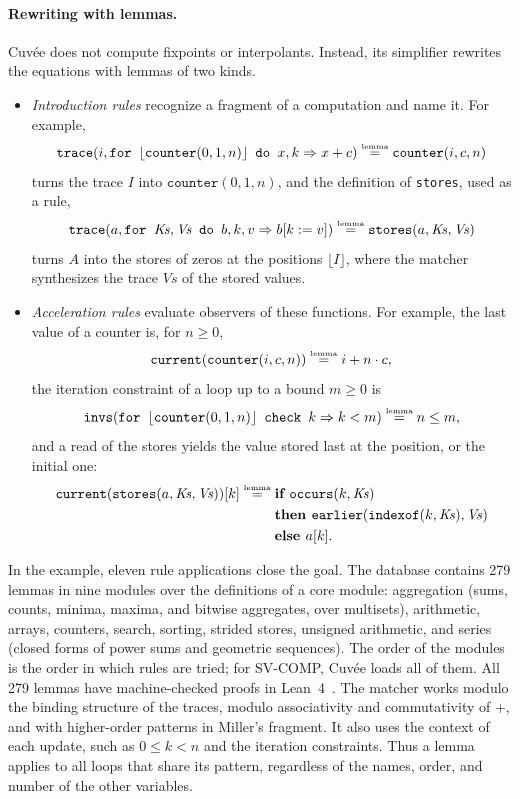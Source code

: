 \documentclass[runningheads]{llncs}
\newcommand{\cuvee}{Cuvée}
\newcommand{\lf}[1]{\lfloor #1 \rfloor}
\newcommand{\code}[1]{\texttt{#1}}
\newcommand{\lemeq}{\mathrel{\overset{\text{\tiny lemma}}{=}}}
\begin{document}
\paragraph{Rewriting with lemmas.}
\cuvee{} does not compute fixpoints or interpolants. Instead, its simplifier rewrites the equations with
lemmas of two kinds.
\begin{itemize}
\item \emph{Introduction rules} recognize a fragment of a computation and name it. For example,
  \[\code{trace}(i, \code{for } \lf{\code{counter}(0, 1, n)} \code{ do } x, k \Rightarrow x + c)
    \lemeq \code{counter}(i, c, n)\]
  turns the trace $I$ into $\code{counter}(0, 1, n)$, and the definition of \code{stores}, used as a rule,
  \[\code{trace}(a, \code{for } \mathit{Ks}, \mathit{Vs} \code{ do } b, k, v \Rightarrow b[k := v])
    \lemeq \code{stores}(a, \mathit{Ks}, \mathit{Vs})\]
  turns $A$ into the stores of zeros at the positions $\lf{I}$, where the matcher synthesizes the trace
  $\mathit{Vs}$ of the stored values.
\item \emph{Acceleration rules} evaluate observers of these functions. For example, the last value of a
  counter is, for $n \ge 0$,
  \[\code{current}(\code{counter}(i, c, n)) \lemeq i + n \cdot c,\]
  the iteration constraint of a loop up to a bound $m \ge 0$ is
  \[\code{invs}(\code{for } \lf{\code{counter}(0, 1, n)} \code{ check } k \Rightarrow k < m) \lemeq n \le m,\]
  and a read of the stores yields the value stored last at the position, or the initial one:
  \begin{align*}
    \code{current}(\code{stores}(a, \mathit{Ks}, \mathit{Vs}))[k] \lemeq{}
      & \textbf{if } \code{occurs}(k, \mathit{Ks})\\
      & \textbf{then } \code{earlier}(\code{indexof}(k, \mathit{Ks}), \mathit{Vs})\\
      & \textbf{else } a[k].
  \end{align*}
\end{itemize}
In the example, eleven rule applications close the goal.
The database contains 279 lemmas in nine modules over the definitions of a core module: aggregation
(sums, counts, minima, maxima, and bitwise aggregates, over multisets), arithmetic, arrays, counters,
search, sorting, strided stores, unsigned arithmetic, and series (closed forms of power sums and
geometric sequences). The order of the modules is the order in which rules are tried; for SV-COMP,
\cuvee{} loads all of them. All 279 lemmas have machine-checked proofs in Lean~4~\cite{lean4}. The matcher works modulo the binding structure of the
traces, modulo associativity and commutativity of $+$, and with higher-order patterns in Miller's fragment.
It also uses the context of each update, such as $0 \le k < n$ and the iteration constraints. Thus a lemma
applies to all loops that share its pattern, regardless of the names, order, and number of the other
variables.
\end{document}
